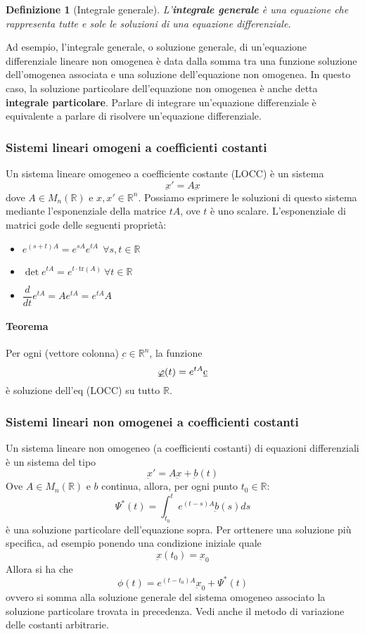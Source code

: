 \documentclass[a4paper,12pt]{article}
\newtheorem{defi}{Definizione}
\begin{document}
\begin{defi}[Integrale generale]
L'\textbf{integrale generale} è una equazione che rappresenta tutte e sole le soluzioni di una equazione differenziale.
\end{defi}
Ad esempio, l'integrale generale, o soluzione generale, di un'equazione differenziale lineare non omogenea è data dalla somma tra una funzione soluzione dell'omogenea associata e una soluzione dell'equazione non omogenea. In questo caso, la soluzione particolare dell'equazione non omogenea è anche detta \textbf{integrale particolare}. Parlare di integrare un'equazione differenziale è equivalente a parlare di risolvere un'equazione differenziale.

\subsubsection{Sistemi lineari omogeni a coefficienti costanti}
Un sistema lineare omogeneo a coefficiente costante (LOCC) è un sistema
$$\underbar{x}' = A\underbar{x}$$
dove $A \in M_n(\mathbb{R})$ e $x,x'\in\mathbb{R}^n$. Possiamo esprimere le soluzioni di questo sistema mediante l'esponenziale della matrice $tA$, ove $t$ è uno scalare.
L'esponenziale di matrici gode delle seguenti proprietà:
\begin{itemize}
\item $e^{(s+t)A} = e^{sA}e^{tA} \ \ \forall s,t \in \mathbb{R} $
\item $\det e^{tA}=e^{t\cdot\text{tr}(A)} \ \forall t \in \mathbb{R} $
\item $\dfrac{d}{dt} e^{tA} = A e^{tA} = e^{tA}A$
\end{itemize}

\paragraph{Teorema} Per ogni (vettore colonna) $\underbar{c} \in \mathbb{R}^n $, la funzione $$ \underbar{$\varphi$}(t) = e^{tA} \underbar{c} $$è soluzione dell'eq (LOCC) su tutto $\mathbb{R}$.

\subsubsection{Sistemi lineari non omogenei a coefficienti costanti}
Un sistema lineare non omogeneo (a coefficienti costanti) di equazioni differenziali è un sistema del tipo
$$\underbar{x}'=A\underbar{x}+\underbar{b}(t)$$
Ove $A\in M_n(\mathbb{R})$ e $b$ continua, allora, per ogni punto $t_0 \in \mathbb{R}$:
$$\Psi^*(t)= \int_{t_0}^t e^{(t-s)A} \underbar{b}(s)ds$$
è una soluzione particolare dell'equazione sopra.
Per orttenere una soluzione più specifica, ad esempio ponendo una condizione iniziale quale
$$\underbar{x}(t_0)=\underbar{x}_0$$
Allora si ha che
$$\phi(t)=e^{(t-t_0)A}\underbar{x}_0+\Psi^*(t)$$
ovvero si somma alla soluzione generale del sistema omogeneo associato la soluzione particolare trovata in precedenza.
Vedi anche il metodo di variazione delle costanti arbitrarie.
\end{document}
